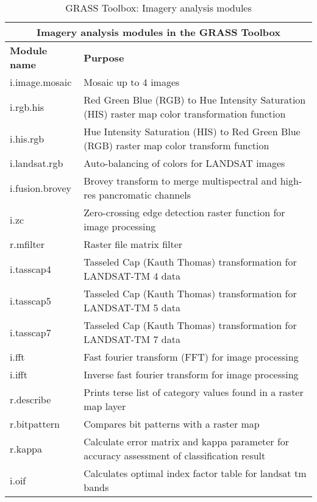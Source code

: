 \begin{table}[ht]
\centering
\caption{GRASS Toolbox: Imagery analysis modules}\medskip
 \begin{tabular}{|p{4cm}|p{12cm}|}
  \hline \multicolumn{2}{|c|}{\textbf{Imagery analysis modules in the GRASS
  Toolbox}} \\
  \hline \textbf{Module name} & \textbf{Purpose} \\
  \hline i.image.mosaic & Mosaic up to 4 images \\
  \hline i.rgb.his & Red Green Blue (RGB) to Hue Intensity Saturation (HIS)
  raster map color transformation function \\
  \hline i.his.rgb & Hue Intensity Saturation (HIS) to Red Green Blue (RGB)
  raster map color transform function \\
  \hline i.landsat.rgb & Auto-balancing of colors for LANDSAT images \\
  \hline i.fusion.brovey & Brovey transform to merge multispectral and
  high-res pancromatic channels \\
  \hline i.zc & Zero-crossing edge detection raster function for image
  processing \\
  \hline r.mfilter &  Raster file matrix filter\\
  \hline i.tasscap4 & Tasseled Cap (Kauth Thomas) transformation for
  LANDSAT-TM 4 data \\
  \hline i.tasscap5 & Tasseled Cap (Kauth Thomas) transformation for
  LANDSAT-TM 5 data \\
  \hline i.tasscap7 & Tasseled Cap (Kauth Thomas) transformation for
  LANDSAT-TM 7 data \\
  \hline i.fft & Fast fourier transform (FFT) for image processing \\
  \hline i.ifft & Inverse fast fourier transform for image processing \\
  \hline r.describe & Prints terse list of category values found in a raster
  map layer \\
  \hline r.bitpattern & Compares bit patterns with a raster map \\
  \hline r.kappa & Calculate error matrix and kappa parameter for accuracy
  assessment of classification result \\
  \hline i.oif & Calculates optimal index factor table for landsat tm bands \\
\hline
\end{tabular}
\end{table}

\clearpage

